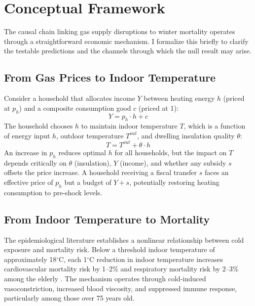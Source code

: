 \documentclass[12pt]{article}
\begin{document}
\section{Conceptual Framework}
\label{sec:framework}

The causal chain linking gas supply disruptions to winter mortality operates through a straightforward economic mechanism. I formalize this briefly to clarify the testable predictions and the channels through which the null result may arise.

\subsection{From Gas Prices to Indoor Temperature}

Consider a household that allocates income $Y$ between heating energy $h$ (priced at $p_h$) and a composite consumption good $c$ (priced at 1):
\begin{equation}
Y = p_h \cdot h + c
\end{equation}
The household chooses $h$ to maintain indoor temperature $T$, which is a function of energy input $h$, outdoor temperature $T^{out}$, and dwelling insulation quality $\theta$:
\begin{equation}
T = T^{out} + \theta \cdot h
\end{equation}
An increase in $p_h$ reduces optimal $h$ for all households, but the impact on $T$ depends critically on $\theta$ (insulation), $Y$ (income), and whether any subsidy $s$ offsets the price increase. A household receiving a fiscal transfer $s$ faces an effective price of $p_h$ but a budget of $Y + s$, potentially restoring heating consumption to pre-shock levels.

\subsection{From Indoor Temperature to Mortality}

The epidemiological literature establishes a nonlinear relationship between cold exposure and mortality risk. Below a threshold indoor temperature of approximately 18$^{\circ}$C, each 1$^{\circ}$C reduction in indoor temperature increases cardiovascular mortality risk by 1--2\% and respiratory mortality risk by 2--3\% among the elderly \citep{wilkinson2001, gasparrini2015}. The mechanism operates through cold-induced vasoconstriction, increased blood viscosity, and suppressed immune response, particularly among those over 75 years old.
\end{document}

